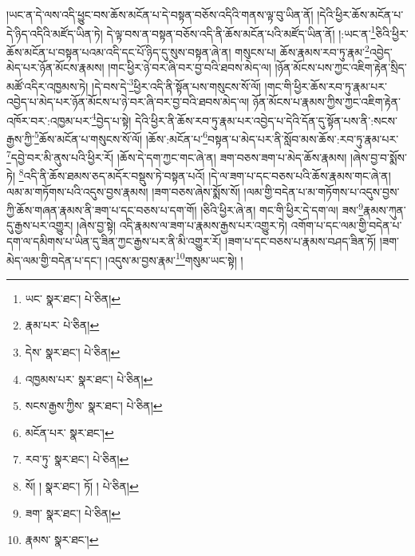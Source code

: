 །ཡང་ན་དེ་ལས་འདི་ཕྱུང་བས་ཆོས་མངོན་པ་དེ་བསྟན་བཅོས་འདིའི་གནས་ལྟ་བུ་ཡིན་ནོ། །དེའི་ཕྱིར་ཆོས་མངོན་པ་དེ་ཉིད་འདིའི་མཛོད་ཡིན་ཏེ། དེ་ལྟ་བས་ན་བསྟན་བཅོས་འདི་ནི་ཆོས་མངོན་པའི་མཛོད་ཡིན་ནོ། །:ཡང་ན་\footnote{ཡང་  སྣར་ཐང་།  པེ་ཅིན། }ཅིའི་ཕྱིར་ཆོས་མངོན་པ་བསྟན་པའམ་འདི་དང་པོ་ཉིད་དུ་སུས་བསྟན་ཞེ་ན། གསུངས་པ། ཆོས་རྣམས་རབ་ཏུ་རྣམ་\footnote{རྣམ་པར་  པེ་ཅིན། }འབྱེད་མེད་པར་ཉོན་མོངས་རྣམས། །གང་ཕྱིར་ཉེ་བར་ཞི་བར་བྱ་བའི་ཐབས་མེད་ལ། །ཉོན་མོངས་པས་ཀྱང་འཇིག་རྟེན་སྲིད་མཚོ་འདིར་འཁྱམས་ཏེ། །དེ་བས་དེ་\footnote{དེས་  སྣར་ཐང་།  པེ་ཅིན། }ཕྱིར་འདི་ནི་སྟོན་པས་གསུངས་སོ་ལོ། །གང་གི་ཕྱིར་ཆོས་རབ་ཏུ་རྣམ་པར་འབྱེད་པ་མེད་པར་ཉོན་མོངས་པ་ཉེ་བར་ཞི་བར་བྱ་བའི་ཐབས་མེད་ལ། ཉོན་མོངས་པ་རྣམས་ཀྱིས་ཀྱང་འཇིག་རྟེན་འཁོར་བར་:འཁྱམ་པར་\footnote{འཁྱམས་པར་  སྣར་ཐང་།  པེ་ཅིན། }བྱེད་པ་སྟེ། དེའི་ཕྱིར་ནི་ཆོས་རབ་ཏུ་རྣམ་པར་འབྱེད་པ་དེའི་དོན་དུ་སྟོན་པས་ནི་:སངས་རྒྱས་ཀྱི་\footnote{སངས་རྒྱས་ཀྱིས་  སྣར་ཐང་།  པེ་ཅིན། }ཆོས་མངོན་པ་གསུངས་སོ་ལོ། །ཆོས་:མངོན་པ་\footnote{མངོན་པར་  སྣར་ཐང་། }བསྟན་པ་མེད་པར་ནི་སློབ་མས་ཆོས་:རབ་ཏུ་རྣམ་པར་\footnote{རབ་ཏུ་  སྣར་ཐང་།  པེ་ཅིན། }དབྱེ་བར་མི་ནུས་པའི་ཕྱིར་རོ། །ཆོས་དེ་དག་ཀྱང་གང་ཞེ་ན། ཟག་བཅས་ཟག་པ་མེད་ཆོས་རྣམས། །ཞེས་བྱ་བ་སྨོས་ཏེ། \footnote{སོ། །   སྣར་ཐང་། ཏོ། །   པེ་ཅིན། }འདི་ནི་ཆོས་ཐམས་ཅད་མདོར་བསྡུས་ཏེ་བསྟན་པའོ། །དེ་ལ་ཟག་པ་དང་བཅས་པའི་ཆོས་རྣམས་གང་ཞེ་ན། ལམ་མ་གཏོགས་པའི་འདུས་བྱས་རྣམས། །ཟག་བཅས་ཞེས་སྨོས་སོ། །ལམ་གྱི་བདེན་པ་མ་གཏོགས་པ་འདུས་བྱས་ཀྱི་ཆོས་གཞན་རྣམས་ནི་ཟག་པ་དང་བཅས་པ་དག་གོ། །ཅིའི་ཕྱིར་ཞེ་ན། གང་གི་ཕྱིར་དེ་དག་ལ། ཟས་\footnote{ཟག་  སྣར་ཐང་།  པེ་ཅིན། }རྣམས་ཀུན་དུ་རྒྱས་པར་འགྱུར། །ཞེས་བྱ་སྟེ། འདི་རྣམས་ལ་ཟག་པ་རྣམས་རྒྱས་པར་འགྱུར་ཏེ། འགོག་པ་དང་ལམ་གྱི་བདེན་པ་དག་ལ་དམིགས་པ་ཡིན་དུ་ཟིན་ཀྱང་རྒྱས་པར་ནི་མི་འགྱུར་རོ། །ཟག་པ་དང་བཅས་པ་རྣམས་བཤད་ཟིན་ཏོ། །ཟག་མེད་ལམ་གྱི་བདེན་པ་དང་། །འདུས་མ་བྱས་རྣམ་\footnote{རྣམས་  སྣར་ཐང་། }གསུམ་ཡང་སྟེ། །
